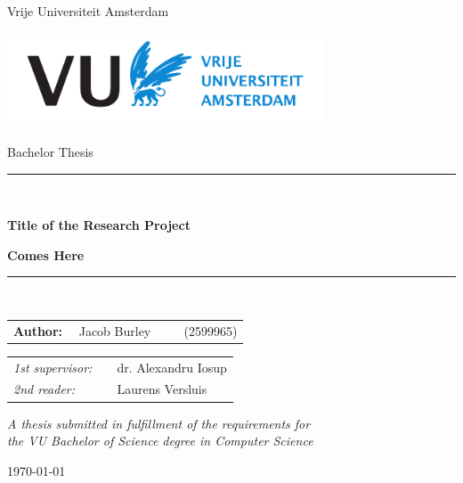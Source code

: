 \documentclass[11pt]{article}
\begin{document}
\thispagestyle{empty}

\begin{center}

Vrije Universiteit Amsterdam

\vspace{1mm}

\includegraphics[height=28mm]{vu-griffioen-white.pdf}

\vspace{1.5cm}

{\Large Bachelor Thesis}

\vspace*{1.5cm}

\rule{.9\linewidth}{.6pt}\\[0.4cm]
{\huge \bfseries Title of the Research Project\par}
{\huge \bfseries Comes Here\par}\vspace{0.4cm}
\rule{.9\linewidth}{.6pt}\\[1.5cm]

\vspace*{2mm}

{\Large
\begin{tabular}{l}
{\bf Author:} ~~Jacob Burley ~~~~ (2599965)
\end{tabular}
}

\vspace*{1.5cm}

\begin{tabular}{ll}
{\it 1st supervisor:}   & ~~dr. Alexandru Iosup \\
{\it 2nd reader:}       & ~~Laurens Versluis
\end{tabular}

\vspace*{2cm}

\textit{A thesis submitted in fulfillment of the requirements for\\ the VU Bachelor of Science degree in Computer Science}

\vspace*{1cm}

\today\\[4cm] %

\end{center}
\end{document}
